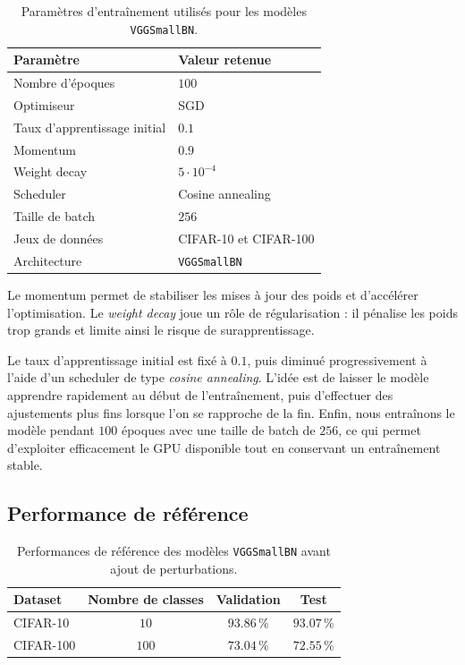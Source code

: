 \begin{table}[H]
    \centering
    \small
    \begin{tabular}{|l|l|}
        \hline
        \textbf{Paramètre} & \textbf{Valeur retenue} \\
        \hline
        Nombre d'époques & $100$ \\
        \hline
        Optimiseur & SGD \\
        \hline
        Taux d'apprentissage initial & $0.1$ \\
        \hline
        Momentum & $0.9$ \\
        \hline
        Weight decay & $5\cdot 10^{-4}$ \\
        \hline
        Scheduler & Cosine annealing \\
        \hline
        Taille de batch & $256$ \\
        \hline
        Jeux de données & CIFAR-10 et CIFAR-100 \\
        \hline
        Architecture & \texttt{VGGSmallBN} \\
        \hline
    \end{tabular}
    \caption{Paramètres d'entraînement utilisés pour les modèles \texttt{VGGSmallBN}.}
    \label{tab:parametres_entrainement_vgg}
\end{table}

Le momentum permet de stabiliser les mises à jour des poids et
d'accélérer l'optimisation. Le \textit{weight decay} joue un rôle de régularisation : il pénalise les poids
trop grands et limite ainsi le risque de surapprentissage.

Le taux d'apprentissage initial est fixé à $0.1$, puis diminué progressivement à l'aide d'un scheduler
de type \textit{cosine annealing}. L'idée est de laisser le modèle apprendre rapidement au début de
l'entraînement, puis d'effectuer des ajustements plus fins lorsque l'on se rapproche de la fin. Enfin,
nous entraînons le modèle pendant $100$ époques avec une taille de batch de $256$, ce qui permet
d'exploiter efficacement le GPU disponible tout en conservant un entraînement stable.

\subsection{Performance de référence}

\begin{table}[H]
    \centering
    \small
    \begin{tabular}{|l|c|c|c|}
        \hline
        \textbf{Dataset} & \textbf{Nombre de classes} & \textbf{Validation} & \textbf{Test} \\
        \hline
        CIFAR-10 & $10$ & $93.86\,\%$ & $93.07\,\%$ \\
        \hline
        CIFAR-100 & $100$ & $73.04\,\%$ & $72.55\,\%$ \\
        \hline
    \end{tabular}
    \caption{Performances de référence des modèles \texttt{VGGSmallBN} avant ajout de perturbations.}
    \label{tab:performance_reference_vgg}
\end{table}

